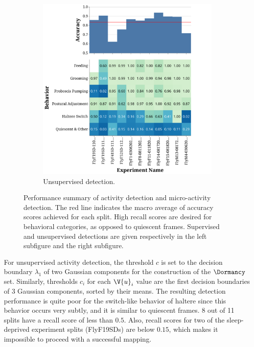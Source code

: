 \begin{figure}[htb!]
\begin{subfigure}[b]{0.495\linewidth}
		\centering\includegraphics[width=\linewidth]{figures/ActivityDetectionPerformance-Unsupervised.pdf}
		\caption{Unsupervised detection.}
	\end{subfigure}%
	\caption[Performance summary of activity detection and micro-activity detection.]{Performance summary of activity detection and micro-activity detection.
		The red line indicates the macro average of accuracy scores achieved for each split.
		High recall scores are desired for behavioral categories, as opposed to quiescent frames.
		Supervised and unsupervised detections are given respectively in the left subfigure and the right subfigure. \label{figure:detection-performance}}
\end{figure}

For unsupervised activity detection, the threshold $c$ is set to the decision boundary $\lambda_1$ of two Gaussian components for the construction of the $\Dormancy$ set.
Similarly, thresholds $c_i$ for each $\V{u}_i$ value are the first decision boundaries of $3$ Gaussian components, sorted by their means.
The resulting detection performance is quite poor for the switch-like behavior of haltere since this behavior occurs very subtly, and it is similar to quiescent frames.
8 out of 11 splits have a recall score of less than $0.5$.
Also, recall scores for two of the sleep-deprived experiment splits (FlyF19SDs) are below $0.15$, which makes it impossible to proceed with a successful mapping.

